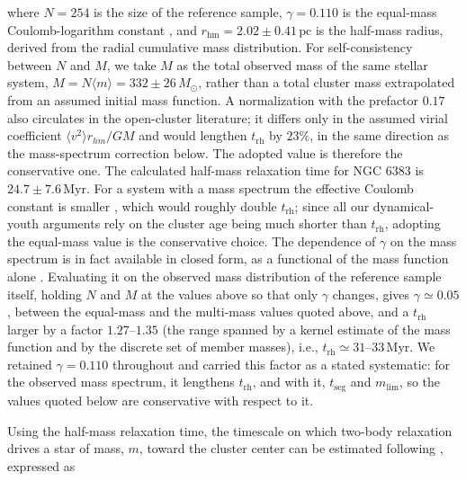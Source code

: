\documentclass{aa}
\begin{document}
where $N=254$ is the size of the reference sample, $\gamma = 0.110$ is the equal-mass Coulomb-logarithm constant \citep[not to be confused with the HDBSCAN density level $\lambda$ of Sect.~\ref{subsubsec:membership};][]{1994MNRAS.268..257G}, and $r_\mathrm{hm} = 2.02 \pm 0.41\,\mathrm{pc}$ is the half-mass radius, derived from the radial cumulative mass distribution. For self-consistency between $N$ and $M$, we take $M$ as the total observed mass of the same stellar system, $M = N\langle m \rangle = 332 \pm 26\,M_\odot$, rather than a total cluster mass extrapolated from an assumed initial mass function. A normalization with the prefactor $0.17$ also circulates in the open-cluster literature; it differs only in the assumed virial coefficient $\langle v^2\rangle r_{hm}/GM$ \citep[the value $0.4$ adopted here follows][]{1971ApJ...164..399S} and would lengthen $t_{\mathrm{rh}}$ by $23\%$, in the same direction as the mass-spectrum correction below. The adopted value is therefore the conservative one. The calculated half-mass relaxation time for NGC 6383 is $24.7\pm 7.6\,\mathrm{Myr}$. For a system with a mass spectrum the effective Coulomb constant is smaller \citep[$\gamma\simeq0.02$;][]{1996MNRAS.279.1037G}, which would roughly double $t_{\mathrm{rh}}$; since all our dynamical-youth arguments rely on the cluster age being much shorter than $t_{\mathrm{rh}}$, adopting the equal-mass value is the conservative choice. The dependence of $\gamma$ on the mass spectrum is in fact available in closed form, as a functional of the mass function alone \citep[Eqs.~11 and 26]{1975IAUS...69..133H}. Evaluating it on the observed mass distribution of the reference sample itself, holding $N$ and $M$ at the values above so that only $\gamma$ changes, gives $\gamma\simeq0.05$, between the equal-mass and the multi-mass values quoted above, and a $t_{\mathrm{rh}}$ larger by a factor $1.27$--$1.35$ (the range spanned by a kernel estimate of the mass function and by the discrete set of member masses), i.e., $t_{\mathrm{rh}}\simeq31$--$33\,\mathrm{Myr}$. We retained $\gamma=0.110$ throughout and carried this factor as a stated systematic: for the observed mass spectrum, it lengthens $t_{\mathrm{rh}}$, and with it, $t_{\mathrm{seg}}$ and $m_{\mathrm{lim}}$, so the values quoted below are conservative with respect to it.

Using the half-mass relaxation time, the timescale on which two-body relaxation drives a star of mass, $m$, toward the cluster center can be estimated following \citet{1969ApJ...158L.139S}, expressed as
\end{document}

